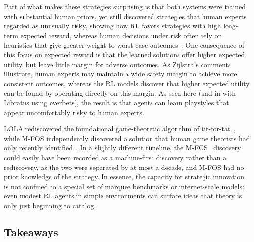\documentclass[10pt]{article}
\def\citep#1{}%
\begin{document}
Part of what makes these strategies surprising is that both systems were trained with substantial human priors, yet still discovered strategies that human experts regarded as unusually risky, showing how RL favors strategies with high long-term expected reward, whereas human decisions under risk often rely on heuristics that give greater weight to worst-case outcomes~\citep{Homma2024riskRL, brandsttter2006, Zhang2014Risk}.
One consequence of this focus on expected reward is that the learned solutions offer higher expected utility, but leave little margin for adverse outcomes.
As Zijlstra's comments illustrate, human experts may maintain a wide safety margin to achieve more consistent outcomes, whereas the RL models discover that higher expected utility can be found by operating directly on this margin.
As seen here (and in  with Libratus using overbets), the result is that agents can learn playstyles that appear uncomfortably risky to human experts.



LOLA rediscovered the foundational game-theoretic algorithm of tit-for-tat~\citep{Axelrod1981gametheory}, while M-FOS independently discovered a solution that human game theorists had only recently identified~\citep{Stewart2013zerodeterminant, Hao2015ZeroDet, Press2012Zerodeterminant}. In a slightly different timeline, the M-FOS~\citep{lu2022modelfreeopponentshaping} discovery could easily have been recorded as a machine-first discovery rather than a rediscovery, as the two were separated by at most a decade, and M-FOS had no prior knowledge of the strategy.
In essence, the capacity for strategic innovation is not confined to a special set of marquee benchmarks or internet-scale models: even modest RL agents in simple environments can surface ideas that theory is only just beginning to catalog.


\subsection{Takeaways}
\end{document}
